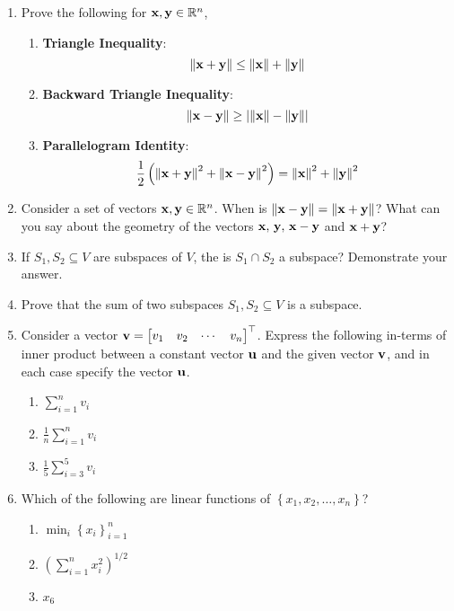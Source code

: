 \documentclass[12pt]{article}
\def\mf{\ensuremath\mathbf}
\begin{document}
\begin{enumerate}
    \item Prove the following for $\mf{x}, \mf{y} \in \mathbb{R}^n$,
    \begin{enumerate}
        \item {\small \textbf{Triangle Inequality}}:
        \[ \left\lVert \mf{x} + \mf{y}\right\rVert \leq \left\lVert \mf{x}\right\rVert + \left\lVert \mf{y}\right\rVert \]
        \item {\small \textbf{Backward Triangle Inequality}}:
        \[ \left\lVert \mf{x} - \mf{y}\right\rVert  \geq \left\lvert \left\lVert \mf{x}\right\rVert - \left\lVert \mf{y}\right\rVert \right\rvert \]
        \item {\small \textbf{Parallelogram Identity}}:
        \[ \frac{1}{2} \left(\left\lVert \mf{x} + \mf{y}\right\rVert^2 + \left\lVert \mf{x} - \mf{y}\right\rVert^2 \right) = \left\lVert \mf{x}\right\rVert^2 + \left\lVert \mf{y}\right\rVert^2 \]
    \end{enumerate}

    \item Consider a set of vectors $\mf{x}, \mf{y} \in \mathbb{R}^n$. When is $\left\lVert \mf{x} - \mf{y} \right\rVert = \left\lVert \mf{x} + \mf{y}\right\rVert$? What can you say about the geometry of the vectors $\mf{x},\,\mf{y},\,\mf{x} - \mf{y}$ and $\mf{x} + \mf{y}$?
    
    \item If $S_1, S_2 \subseteq V$ are subspaces of $V$, the is $S_1 \cap S_2$ a subspace? Demonstrate your answer.
    
    \item Prove that the sum of two subspaces $S_1, S_2 \subseteq V$ is a subspace.
    
    \item Consider a vector $\mf{v} = \begin{bmatrix*}v_1 & v_2 & \cdots & v_n\end{bmatrix*}^\top$. Express the following in-terms of inner product between a constant vector $\mf{u}$ and the given vector $\mf{v}$, and in each case specify the vector $\mf{u}$.
    \begin{enumerate}
        \item $\sum_{i=1}^n v_i$
        \item $\frac{1}{n}\sum_{i=1}^n v_i$
        \item $\frac{1}{5}\sum_{i=3}^5 v_i$
    \end{enumerate} 
    
    \item Which of the following are linear functions of $\left\{x_1, x_2, \ldots,x_n\right\}$?
    \begin{enumerate}
        \item $\min_i \left\{x_i\right\}_{i=1}^{n}$
        \item $\left(\sum_{i=1}^n x_i^2\right)^{1/2}$
        \item $x_6$
    \end{enumerate}
    

\end{enumerate}
\end{document}
